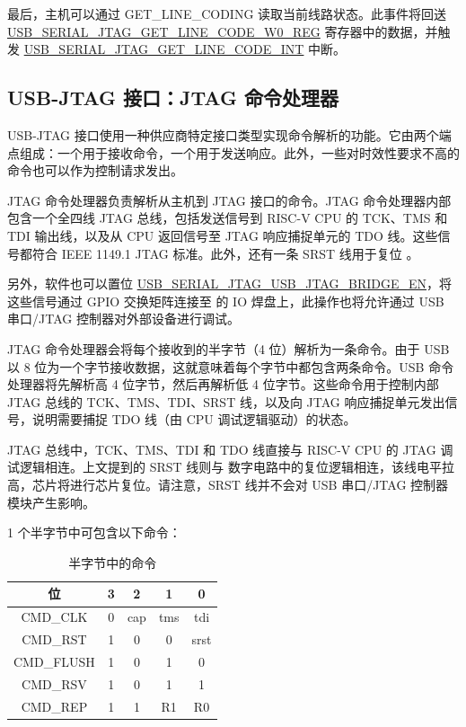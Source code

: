 \documentclass[main\_\_CN.tex]{subfiles}
\begin{document}
最后，主机可以通过 GET\_LINE\_CODING 读取当前线路状态。此事件将回送 \hyperref[regdesc:USBSERIALJTAGGETLINECODEW0REG]{USB\_SERIAL\_JTAG\_GET\_LINE\_CODE\_W0\_REG} 寄存器中的数据，并触发 \hyperref[int:USBSERIALJTAGGETLINECODEINT]{USB\_SERIAL\_JTAG\_GET\_LINE\_CODE\_INT} 中断。

\subsection{USB-JTAG 接口：JTAG 命令处理器}

USB-JTAG 接口使用一种供应商特定接口类型实现命令解析的功能。它由两个端点组成：一个用于接收命令，一个用于发送响应。此外，一些对时效性要求不高的命令也可以作为控制请求发出。

JTAG 命令处理器负责解析从主机到 JTAG 接口的命令。JTAG 命令处理器内部包含一个全四线 JTAG 总线，包括发送信号到 RISC-V CPU 的 TCK、TMS 和 TDI 输出线，以及从 CPU 返回信号至 JTAG 响应捕捉单元的 TDO 线。这些信号都符合 IEEE 1149.1 JTAG 标准。此外，还有一条 SRST 线用于复位 \chipname{}。

另外，软件也可以置位 \hyperref[fielddesc:USBSERIALJTAGUSBJTAGBRIDGEEN]{USB\_SERIAL\_JTAG\_USB\_JTAG\_BRIDGE\_EN}，将这些信号通过 GPIO 交换矩阵连接至 \chipname{} 的 IO 焊盘上，此操作也将允许通过 USB 串口/JTAG 控制器对外部设备进行调试。

JTAG 命令处理器会将每个接收到的半字节（4 位）解析为一条命令。由于 USB 以 8 位为一个字节接收数据，这就意味着每个字节中都包含两条命令。USB 命令处理器将先解析高 4 位字节，然后再解析低 4 位字节。这些命令用于控制内部 JTAG 总线的 TCK、TMS、TDI、SRST 线，以及向 JTAG 响应捕捉单元发出信号，说明需要捕捉 TDO 线（由 CPU 调试逻辑驱动）的状态。

JTAG 总线中，TCK、TMS、TDI 和 TDO 线直接与 RISC-V CPU 的 JTAG 调试逻辑相连。上文提到的 SRST 线则与 \chipname{} 数字电路中的复位逻辑相连，该线电平拉高，芯片将进行芯片复位。请注意，SRST 线并不会对 USB 串口/JTAG 控制器模块产生影响。

1 个半字节中可包含以下命令：

\begin{table}[H]
\centering
\caption{半字节中的命令}
\label{tab:usbserialjtag-commands-of-a-nibble}

\begin{tabular}{|c|c c c c|}\hline
\rowcolor{lightgray}
\textbf{位} & \textbf{3} & \textbf{2} & \textbf{1} & \textbf{0}\\\hline

CMD\_CLK & 0 &  cap & tms & tdi \\\hline
CMD\_RST & 1 & 0 & 0 & srst \\\hline
CMD\_FLUSH & 1 & 0 & 1 & 0 \\\hline
CMD\_RSV & 1 & 0 & 1 & 1 \\\hline
CMD\_REP & 1 & 1 & R1 & R0 \\\hline
\end{tabular}
\end{table}
\end{document}
